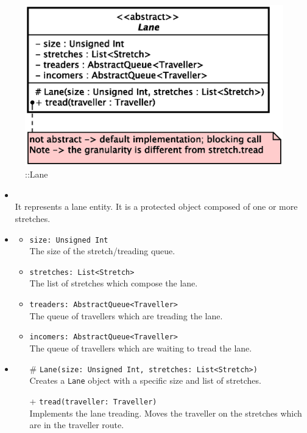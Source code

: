 \begin{figure}[h]
\centering
\includegraphics[scale=0.6,keepaspectratio]{images/solution/app/backend/lane.eps}
\caption{\pReactiveComponentLane::Lane}
\label{fig:sd-app-lane}
\end{figure}
\FloatBarrier
\begin{itemize}
  \item \textbf{\descr} \\
    It represents a lane entity. It is a protected object composed of one or
    more stretches.
  \item \textbf{\attrs}
  \begin{itemize}
    \item \texttt{size: Unsigned Int} \\
The size of the stretch/treading queue.
    \item \texttt{stretches: List<Stretch>} \\
The list of stretches which compose the lane.
    \item \texttt{treaders: AbstractQueue<Traveller>} \\
The queue of travellers which are treading the lane.
    \item \texttt{incomers: AbstractQueue<Traveller>} \\
The queue of travellers which are waiting to tread the lane. 
  \end{itemize}
  \item \textbf{\ops}
  \begin{itemize} 
    \item[\#] \texttt{Lane(size: Unsigned Int, stretches: List<Stretch>)} \\
Creates a \texttt{Lane} object with a specific size and list of stretches.
    \item[+] \texttt{tread(traveller: Traveller)} \\
Implements the lane treading. Moves the traveller on the stretches which are 
in the traveller route.
  \end{itemize}
\end{itemize}
